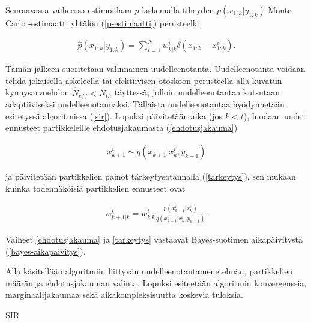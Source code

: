 \documentclass[
  12pt,
  a4paper, twoside]{book}
\begin{document}
\noindent Seuraavassa vaiheessa estimoidaan \(p\) laskemalla tiheyden \(p(x_{1:k}|y_{1:k})\) Monte Carlo -estimaatti yhtälön (\ref{p-estimaatti}) perusteella

\begin{align}\label{p-estimaatti}
\hat{p}(x_{1:k}|y_{1:k})=\sum_{i=1}^{N}w_{k|k}^i \delta(x_{1:k}-x_{1:k}^i).
\end{align}

Tämän jälkeen suoritetaan valinnainen uudelleenotanta. Uudelleenotanta voidaan tehdä jokaisella askeleella tai efektiivisen otoskoon perusteella alla kuvatun kynnysarvoehdon \(\hat{N}_{eff}< N_{th}\) täyttessä, jolloin uudelleenotantaa kutsutaan adaptiiviseksi uudelleenotannaksi. Tällaista uudelleenotantaa hyödynnetään esitetyssä algoritmissa (\ref{sir}). Lopuksi päivitetään aika (jos \(k < t\)), luodaan uudet ennusteet partikkeleille ehdotusjakaumasta (\ref{ehdotusjakauma})

\begin{align}\label{ehdotusjakauma}
x_{k+1}^i\sim q(x_{k+1}|x_k^i,y_{k+1})
\end{align}

\noindent ja päivitetään partikkelien painot tärkeytysotannalla (\ref{tarkeytys}), sen mukaan kuinka todennäköisiä partikkelien ennusteet ovat

\begin{align}\label{tarkeytys} w_{k+1|k}^i=w_{k|k}^i\frac{p(x_{k+1}^i|x_k^i)}{q(x_{k+1}^i|x_k^i,y_{k+1})}.
\end{align}

\noindent Vaiheet \ref{ehdotusjakauma} ja \ref{tarkeytys} vastaavat Bayes-suotimen aikapäivitystä (\ref{bayes-aikapaivitys}).

Alla käsitellään algoritmiin liittyvän uudelleenotantamenetelmän, partikkelien määrän ja ehdotusjakauman valinta. Lopuksi esiteetään algoritmin konvergenssia, marginaalijakaumaa sekä aikakompleksisuutta koskevia tuloksia.

\begin{algorithm}[H]
\label{sir}
\DontPrintSemicolon
\SetAlgoShortEnd
{}
\caption{SIR}
\end{algorithm}
\end{document}
